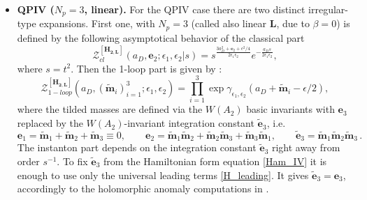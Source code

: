 \documentclass[12pt,a4paper]{article}
\numberwithin{equation}{section}
\newcommand{\D}{\scriptscriptstyle{D}}
\begin{document}
\begin{itemize}
    \item {\bf QPIV ($N_p=3$, linear).}
    For the QPIV case there are two distinct irregular-type expansions. First one, with $N_p=3$ (called also linear $\mathbf{L}$, due to $\beta=0$) is defined by the following asymptotical behavior of the classical part \cite[(4.80)]{BST25}
    \begin{equation}
\mathcal{Z}^{[\mathbf{H_{2,L}}]}_{cl}(a_{\D},\boldsymbol{e}_2;\epsilon_1,\epsilon_2|s)=s^{\frac{3a_{\D}^2+\boldsymbol{e}_2+\epsilon^2/4}{2\epsilon_1\epsilon_2}}e^{-\frac{a_{\D}s}{2\epsilon_1\epsilon_2}},
    \end{equation}
    where $s=t^2$.
    Then the 1-loop part is given by \cite[(4.90)]{BST25}:
\begin{equation}\label{Z1loop_H2L}
\mathcal{Z}_{1-loop}^{[\mathbf{H_{2,L}}]}(a_{\D},(\tilde{\boldsymbol{m}}_i)_{i=1}^3;\epsilon_1,\epsilon_2)= \prod\limits_{i=1}^3  \exp \gamma_{\epsilon_1,\epsilon_2} \left(a_{\D}+\tilde{\boldsymbol{m}}_i-\epsilon/2\right), 
\end{equation}
where the tilded masses are defined via the $W(A_2)$ basic invariants with $\boldsymbol{e}_3$ replaced by the $W(A_2)$-invariant integration constant $\tilde{\boldsymbol{e}}_3$, i.e.
\begin{equation}
\boldsymbol{e}_1=\tilde{\boldsymbol{m}}_1+\tilde{\boldsymbol{m}}_2+\tilde{\boldsymbol{m}}_3\equiv0, \qquad \boldsymbol{e}_2=\tilde{\boldsymbol{m}}_1\tilde{\boldsymbol{m}}_2+\tilde{\boldsymbol{m}}_2\tilde{\boldsymbol{m}}_3+\tilde{\boldsymbol{m}}_3\tilde{\boldsymbol{m}}_1, \qquad \tilde{\boldsymbol{e}}_3=\tilde{\boldsymbol{m}}_1\tilde{\boldsymbol{m}}_2\tilde{\boldsymbol{m}}_3\, .
\end{equation}
The instanton part \cite[(4.85)]{BST25} depends on the integration constant $\tilde{\boldsymbol{e}}_3$ right away from order $s^{-1}$.
To fix $\tilde{\boldsymbol{e}}_3$ from the Hamiltonian form equation \eqref{Ham_IV} it is enough to use only the universal leading terms \eqref{H_leading}. It gives $\tilde{\boldsymbol{e}}_3=\boldsymbol{e}_3$, accordingly to the holomorphic anomaly computations in \cite[Sec. 5.5]{BST25}.
    

\end{itemize}
\end{document}
